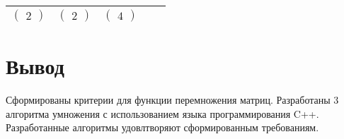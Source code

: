 \begin{table}[h]
\begin{center}
\begin{tabular}{|c|c|c|c|c|}
		$\begin{pmatrix}
			2
		\end{pmatrix}$ &
		$\begin{pmatrix}
			2
		\end{pmatrix}$ &
		$\begin{pmatrix}
			4
		\end{pmatrix}$ \\ \hline

		\end{tabular}
	\end{center}
\end{table}


\newpage
\section*{Вывод}

Сформированы критерии для функции перемножения матриц. Разработаны 3 алгоритма умножения с использованием языка программирования C++. Разработанные алгоритмы удовлтворяют сформированным требованиям.
